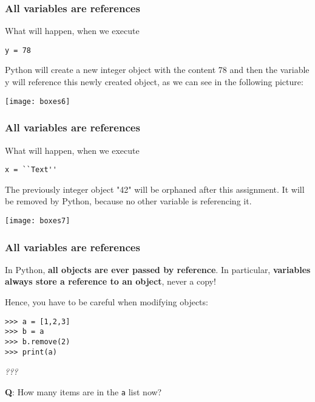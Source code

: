 \begin{frame}[fragile]\frametitle{All variables are references}

What will happen, when we execute 

\begin{lstlisting}
y = 78
\end{lstlisting}
Python will create a new integer object with the content 78 and then the variable y will reference this newly created object, as we can see in the following picture: 


    \begin{center}
\texttt{[image: boxes6]}
\end{center}
  
  
   
   
\end{frame}


\begin{frame}[fragile]\frametitle{All variables are references}

What will happen, when we execute 

\begin{lstlisting}
x = ``Text''
\end{lstlisting}
The previously integer object "42" will be orphaned after this assignment. It will be removed by Python, because no other variable is referencing it. 


    \begin{center}
\texttt{[image: boxes7]}
\end{center}
  
  
   
   
\end{frame}


\begin{frame}[fragile]\frametitle{All variables are references}
In Python, \textbf{all objects are ever passed by reference}.
In particular, \textbf{variables always store a reference to an
    object}, never a copy!

  
  Hence, you have to be careful when modifying objects:
\begin{lstlisting}
>>> a = [1,2,3]
>>> b = a
>>> b.remove(2)
>>> print(a)
\end{lstlisting}

\emph{???}

\textbf{Q}: How many items are in the \texttt{a} list now?
\end{frame}


